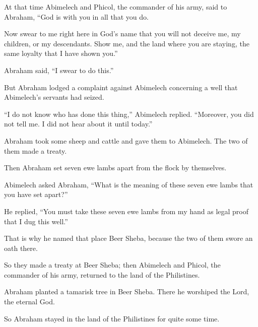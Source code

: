 \begin{scripture}
 At that time Abimelech and Phicol, the commander of his army, said to Abraham, ``God is with you in all that you do.
 Now swear to me right here in God's name that you will not deceive me, my children, or my descendants. Show me, and the land where you are staying, the same loyalty that I have shown you.''
\everypar{}

 Abraham said, ``I swear to do this.''
 But Abraham lodged a complaint against Abimelech concerning a well that Abimelech's servants had seized.
 ``I do not know who has done this thing,'' Abimelech replied. ``Moreover, you did not tell me. I did not hear about it until today.''
\everypar{}

 Abraham took some sheep and cattle and gave them to Abimelech. The two of them made a treaty.
 Then Abraham set seven ewe lambs apart from the flock by themselves.
 Abimelech asked Abraham, ``What is the meaning of these seven ewe lambs that you have set apart?''
 He replied, ``You must take these seven ewe lambs from my hand as legal proof that I dug this well.''
 That is why he named that place Beer Sheba, because the two of them swore an oath there.
\everypar{}

 So they made a treaty at Beer Sheba; then Abimelech and Phicol, the commander of his army, returned to the land of the Philistines.
 Abraham planted a tamarisk tree in Beer Sheba. There he worshiped the Lord, the eternal God.
 So Abraham stayed in the land of the Philistines for quite some time.


\end{scripture}
